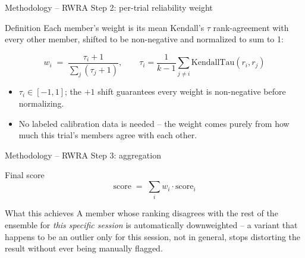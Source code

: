 \documentclass[aspectratio=169,12pt]{beamer}
\begin{document}
\begin{frame}{Methodology -- RWRA Step 2: per-trial reliability weight}
\begin{block}{Definition}
Each member's weight is its mean Kendall's $\tau$ rank-agreement with
every other member, shifted to be non-negative and normalized to sum to 1:
\end{block}

\vspace{0.8em}
\[
w_i \;=\; \frac{\tau_i + 1}{\sum_j (\tau_j + 1)}, \qquad
\tau_i = \frac{1}{k-1}\sum_{j \neq i} \mathrm{KendallTau}(r_i, r_j)
\]

\vspace{0.8em}
\begin{itemize}
  \item $\tau_i \in [-1, 1]$; the $+1$ shift guarantees every weight is
        non-negative before normalizing.
  \item No labeled calibration data is needed -- the weight comes purely
        from how much this trial's members agree with each other.
\end{itemize}
\end{frame}

\begin{frame}{Methodology -- RWRA Step 3: aggregation}
\begin{block}{Final score}
\[
\text{score} \;=\; \sum_i w_i \cdot \text{score}_i
\]
\end{block}

\vspace{0.8em}
\begin{exampleblock}{What this achieves}
A member whose ranking disagrees with the rest of the ensemble for
\emph{this specific session} is automatically downweighted -- a variant
that happens to be an outlier only for this session, not in general, stops
distorting the result without ever being manually flagged.
\end{exampleblock}
\end{frame}
\end{document}
